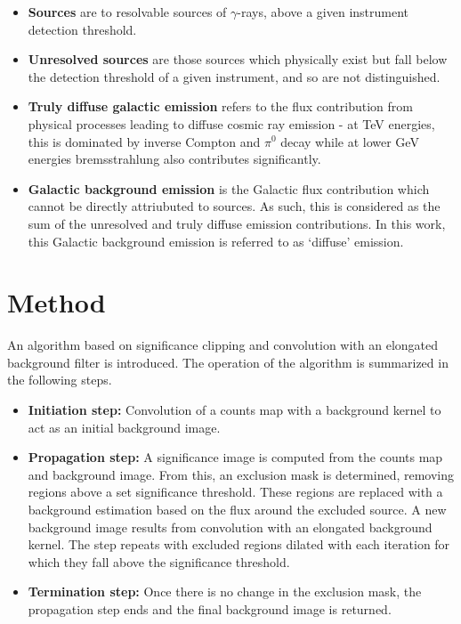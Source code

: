 \documentclass{PoS}
\begin{document}
\begin{itemize}[noitemsep,nolistsep]
\item \textbf{Sources} are to resolvable sources of $\gamma$-rays, above a given instrument detection threshold.
\item \textbf{Unresolved sources} are those sources which physically exist but fall below the detection threshold of a given instrument, and so are not distinguished.
\item \textbf{Truly diffuse galactic emission} refers to the flux contribution from physical processes leading to diffuse cosmic ray emission - at TeV energies, this is dominated by inverse Compton and $\pi^0$ decay while at lower GeV energies bremsstrahlung also contributes significantly.
\item \textbf{Galactic background emission} is the Galactic flux contribution which cannot be directly attriubuted to sources. As such, this is considered as the sum of the unresolved and truly diffuse emission contributions. In this work, this Galactic background emission is referred to as `diffuse' emission.
\end{itemize}

\section{Method}

An algorithm based on significance clipping and convolution with an elongated background filter is introduced. The operation of the algorithm is summarized in the following steps.

\begin{itemize}[noitemsep,nolistsep]
\item \textbf{Initiation step:} Convolution of a counts map with a background kernel to act as an initial background image.
\item \textbf{Propagation step:} A significance image is computed from the counts map and background image. From this, an exclusion mask is determined, removing regions above a set significance threshold. These regions are replaced with a background estimation based on the flux around the excluded source. A new background image results from convolution with an elongated background kernel. The step repeats with excluded regions dilated with each iteration for which they fall above the significance threshold.
\item \textbf{Termination step:} Once there is no change in the exclusion mask, the propagation step ends and the final background image is returned.
\end{itemize}
\end{document}
